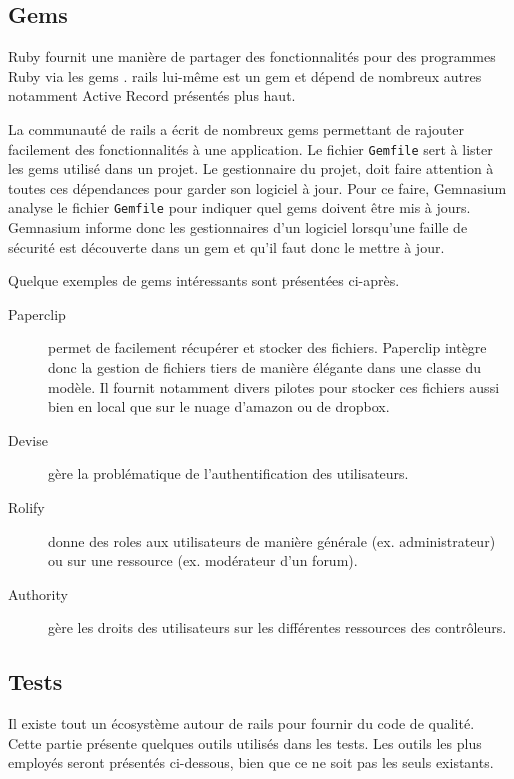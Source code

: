 \subsection{Gems}
\label{gems}
Ruby fournit une manière de partager des fonctionnalités pour des programmes Ruby via les \glspl{gem} \cite{gem}. \gls{rails} lui-même est un \gls{gem} et dépend de nombreux autres notamment Active Record présentés plus haut.

\label{gemnasium}
La communauté de \gls{rails} a écrit de nombreux \glspl{gem}  permettant de rajouter facilement des fonctionnalités à une application. Le fichier \texttt{Gemfile} sert à lister les \glspl{gem}  utilisé dans un projet. Le gestionnaire du projet, doit faire attention à toutes ces dépendances pour garder son logiciel à jour. Pour ce faire, Gemnasium analyse le fichier \texttt{Gemfile} pour indiquer quel \glspl{gem}  doivent être mis à jours. Gemnasium informe donc les gestionnaires d'un logiciel lorsqu'une faille de sécurité est découverte dans un \gls{gem} et qu'il faut donc le mettre à jour.

Quelque exemples de \glspl{gem} intéressants sont présentées ci-après.
\begin{description}
  \item[Paperclip \cite{paperclip}] permet de facilement récupérer et stocker des fichiers. Paperclip intègre donc la gestion de fichiers tiers de manière élégante dans une classe du modèle. Il fournit notamment divers pilotes pour stocker ces fichiers aussi bien en local que sur le nuage d'amazon ou de dropbox.
  \item[Devise \cite{devise}] gère la problématique de l'authentification des utilisateurs.
  \item[Rolify \cite{rolify}] donne des \glspl{role} aux utilisateurs de manière générale (ex. administrateur) ou sur une ressource (ex. modérateur d'un forum).\label{rolify}
  \item[Authority \cite{authority}] gère les droits des utilisateurs sur les différentes ressources des contrôleurs. \label{authority}
\end{description}

\subsection{Tests}
\label{rails-tests}
Il existe tout un écosystème autour de \gls{rails} pour fournir du code de qualité. Cette partie présente quelques outils utilisés dans les tests. Les outils les plus employés seront présentés ci-dessous, bien que ce ne soit pas les seuls existants.

